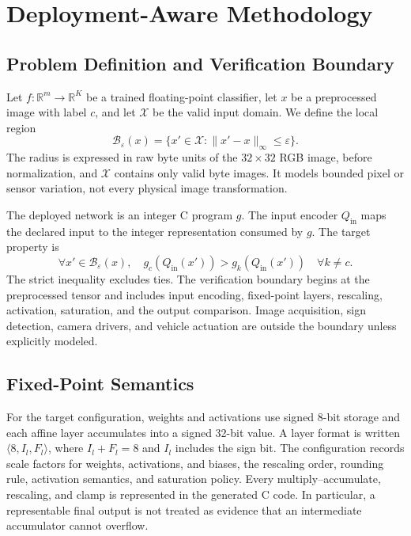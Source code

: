 \section{Deployment-Aware Methodology}
\label{sec:methodology}

\subsection{Problem Definition and Verification Boundary}
\label{sec:problem}

Let $f:\mathbb{R}^{m}\rightarrow\mathbb{R}^{K}$ be a trained floating-point classifier, let $x$ be a preprocessed image with label $c$, and let $\mathcal{X}$ be the valid input domain. We define the local region
\begin{equation}
\mathcal{B}_{\varepsilon}(x)=\{x'\in\mathcal{X}:\|x'-x\|_{\infty}\leq\varepsilon\}.
\label{eq:ball}
\end{equation}
The radius is expressed in raw byte units of the $32\times32$ RGB image, before normalization, and $\mathcal{X}$ contains only valid byte images. It models bounded pixel or sensor variation, not every physical image transformation.

The deployed network is an integer C program $g$. The input encoder $Q_{\mathrm{in}}$ maps the declared input to the integer representation consumed by $g$. The target property is
\begin{equation}
\forall x'\in\mathcal{B}_{\varepsilon}(x),\quad g_c(Q_{\mathrm{in}}(x'))>g_k(Q_{\mathrm{in}}(x'))\quad\forall k\neq c.
\label{eq:robustness}
\end{equation}
The strict inequality excludes ties. The verification boundary begins at the preprocessed tensor and includes input encoding, fixed-point layers, rescaling, activation, saturation, and the output comparison. Image acquisition, sign detection, camera drivers, and vehicle actuation are outside the boundary unless explicitly modeled.

\subsection{Fixed-Point Semantics}
\label{sec:synthesis}


For the target configuration, weights and activations use signed 8-bit storage and each affine layer accumulates into a signed 32-bit value. A layer format is written $\langle 8,I_l,F_l\rangle$, where $I_l+F_l=8$ and $I_l$ includes the sign bit. The configuration records scale factors for weights, activations, and biases, the rescaling order, rounding rule, activation semantics, and saturation policy. Every multiply--accumulate, rescaling, and clamp is represented in the generated C code. In particular, a representable final output is not treated as evidence that an intermediate accumulator cannot overflow.

